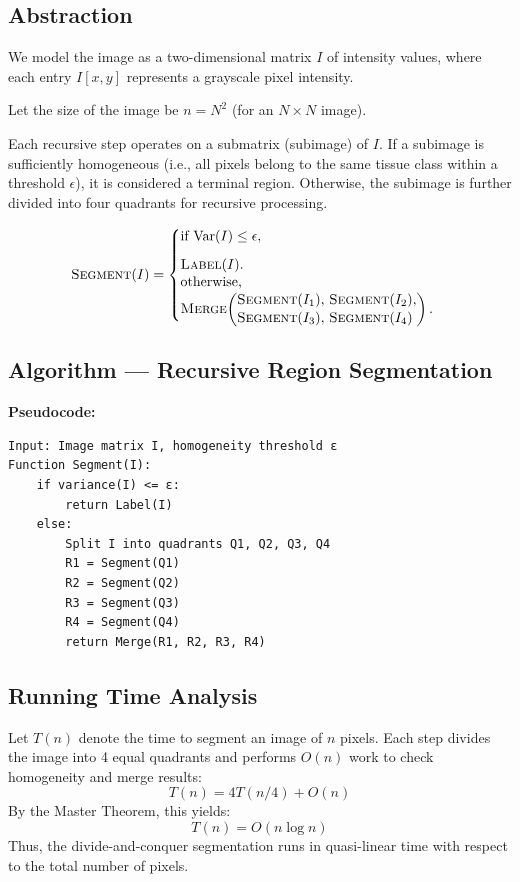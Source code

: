 \documentclass[conference]{IEEEtran}
\begin{document}
\subsection{Abstraction}
We model the image as a two-dimensional matrix $I$ of intensity values, where each entry $I[x,y]$ represents a grayscale pixel intensity.  

Let the size of the image be $n = N^2$ (for an $N \times N$ image).  

Each recursive step operates on a submatrix (subimage) of $I$. If a subimage is sufficiently homogeneous (i.e., all pixels belong to the same tissue class within a threshold $\epsilon$), it is considered a terminal region. Otherwise, the subimage is further divided into four quadrants for recursive processing.

\begin{equation}
\textsc{Segment}(I) =
\begin{cases}
\text{if } \mathrm{Var}(I) \le \epsilon,\\[6pt]
\textsc{Label}(I).\\[-2pt]
\text{otherwise,}\\
\textsc{Merge}\!\left(
\begin{aligned}
&\textsc{Segment}(I_1),\, \textsc{Segment}(I_2),\\[-2pt]
&\textsc{Segment}(I_3),\, \textsc{Segment}(I_4)
\end{aligned}
\right).\\[-2pt]

\end{cases}
\label{eq:segment}
\end{equation}





\subsection{Algorithm — Recursive Region Segmentation}

\textbf{Pseudocode:}
\begin{verbatim}
Input: Image matrix I, homogeneity threshold ε
Function Segment(I):
    if variance(I) <= ε:
        return Label(I)
    else:
        Split I into quadrants Q1, Q2, Q3, Q4
        R1 = Segment(Q1)
        R2 = Segment(Q2)
        R3 = Segment(Q3)
        R4 = Segment(Q4)
        return Merge(R1, R2, R3, R4)
\end{verbatim}

\subsection{Running Time Analysis}
Let $T(n)$ denote the time to segment an image of $n$ pixels. Each step divides the image into 4 equal quadrants and performs $O(n)$ work to check homogeneity and merge results:
\[
T(n) = 4T(n/4) + O(n)
\]
By the Master Theorem, this yields:
\[
T(n) = O(n \log n)
\]
Thus, the divide-and-conquer segmentation runs in quasi-linear time with respect to the total number of pixels.
\end{document}
